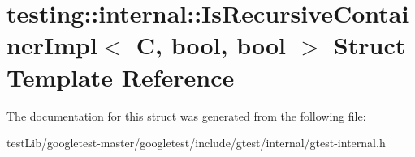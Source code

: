 \hypertarget{structtesting_1_1internal_1_1IsRecursiveContainerImpl}{}\section{testing\+:\+:internal\+:\+:Is\+Recursive\+Container\+Impl$<$ C, bool, bool $>$ Struct Template Reference}
\label{structtesting_1_1internal_1_1IsRecursiveContainerImpl}


The documentation for this struct was generated from the following file\+:\begin{DoxyCompactItemize}
\item 
test\+Lib/googletest-\/master/googletest/include/gtest/internal/gtest-\/internal.\+h\end{DoxyCompactItemize}
